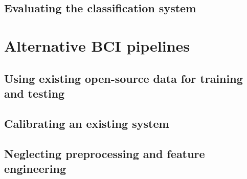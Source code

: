 \lipsum[1-3]


\subsection{Evaluating the classification system}
\label{subsec:processing_signals_general_pipeline_evaluating}


\lipsum[1-6]



\section{Alternative BCI pipelines}
\label{sec:processing_signals_alternative_pipelines}


\subsection{Using existing open-source data for training and testing}
\label{subsec:processing_signals_alternative_pipelines_using_existing_data}

\lipsum[1-3]


\subsection{Calibrating an existing system}
\label{subsec:processing_signals_alternative_calibration}


\lipsum[1-3]


\subsection{Neglecting preprocessing and feature engineering}
\label{subsec:processing_signals_alternative_pipelines_no_preprocessing_and_features}

\lipsum[1-2]

